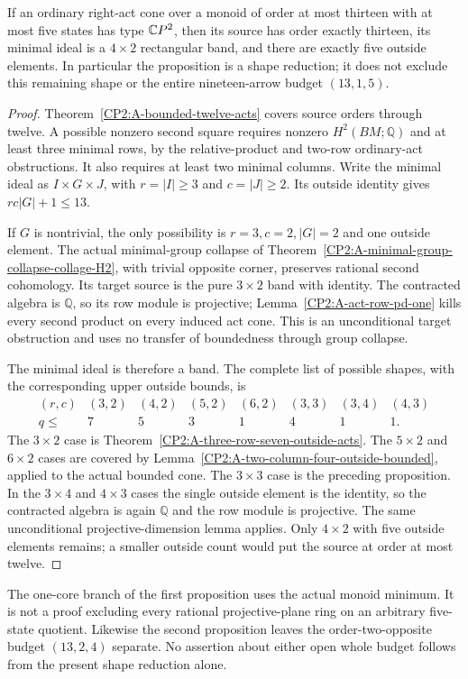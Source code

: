\begin{proposition}
\label{CP2:A-thirteen-five-state-single-shape}
If an ordinary right-act cone over a monoid of order at most
thirteen with at most five states has type $\mathbb{C}P^2$, then its
source has order exactly thirteen, its minimal ideal is a
$4\times2$ rectangular band, and there are exactly five outside
elements. In particular the proposition is a shape reduction;
it does not exclude this remaining shape or the entire
nineteen-arrow budget $(13,1,5)$.
\end{proposition}
\begin{proof}
Theorem~\ref{CP2:A-bounded-twelve-acts} covers source orders through
twelve. A possible nonzero second square requires nonzero
$H^2(BM;\mathbb Q)$ and at least three minimal rows, by the
relative-product and two-row ordinary-act obstructions. It
also requires at least two minimal columns. Write the minimal
ideal as $I\times G\times J$, with $r=|I|\geq3$ and
$c=|J|\geq2$. Its outside identity gives
$rc|G|+1\leq13$.

If $G$ is nontrivial, the only possibility is
$r=3,c=2,|G|=2$ and one outside element. The actual minimal-group
collapse of Theorem~\ref{CP2:A-minimal-group-collapse-collage-H2},
with trivial opposite corner, preserves rational second
cohomology. Its target source is the pure $3\times2$ band with
identity. The contracted algebra is $\mathbb Q$, so its row
module is projective; Lemma~\ref{CP2:A-act-row-pd-one} kills
every second product on every induced act cone. This is an
unconditional target obstruction and uses no transfer of
boundedness through group collapse.

The minimal ideal is therefore a band. The complete list of
possible shapes, with the corresponding upper outside bounds,
is
\[
\begin{array}{c|rrrrrrr}
 (r,c)&(3,2)&(4,2)&(5,2)&(6,2)&(3,3)&(3,4)&(4,3)\\\hline
 q\leq&7&5&3&1&4&1&1.
\end{array}
\]
The $3\times2$ case is
Theorem~\ref{CP2:A-three-row-seven-outside-acts}. The
$5\times2$ and $6\times2$ cases are covered by
Lemma~\ref{CP2:A-two-column-four-outside-bounded}, applied to
the actual bounded cone. The $3\times3$ case is the preceding
proposition. In the $3\times4$ and $4\times3$ cases the single
outside element is the identity, so the contracted algebra is
again $\mathbb Q$ and the row module is projective. The same
unconditional projective-dimension lemma applies.
Only $4\times2$ with five outside elements remains; a smaller
outside count would put the source at order at most twelve.
\end{proof}

\begin{remark*}
The one-core branch of the first proposition uses the actual
monoid minimum. It is not a proof excluding every rational
projective-plane ring on an arbitrary five-state quotient.
Likewise the second proposition leaves the order-two-opposite
budget $(13,2,4)$ separate. No assertion about either open
whole budget follows from the present shape reduction alone.
\end{remark*}
